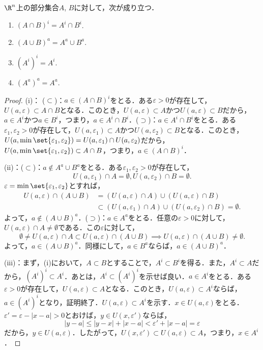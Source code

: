\documentclass[a4paper,10pt]{ltjsarticle}
\begin{document}
\begin{MyProposition}
  \(\R^n\)上の部分集合\(A\), \(B\)に対して，次が成り立つ．
  \begin{enumerate}
    \item \((A \cap B)^i = A^i \cap B^i\).
    \item \((A \cup B)^a = A^a \cup B^a\).
    \item \((A^i)^i = A^i\).
    \item \((A^a)^a = A^a\).
  \end{enumerate}
\end{MyProposition}
\begin{proof}
  (i)： (\(\subset\))：\(a \in (A \cap B)^i\)をとる．ある\(\varepsilon > 0\)が存在して，\(U(a, \varepsilon) \subset A \cap B\)となる．このとき，\(U(a, \varepsilon) \subset A\)かつ\(U(a, \varepsilon) \subset B\)だから，\(a \in A^i\)かつ\(a \in B^i\)，つまり，\(a \in A^i \cap B^i\)．(\(\supset\))：\(a \in A^i \cap B^i\)をとる．ある\(\varepsilon_1, \varepsilon_2 > 0\)が存在して，\(U(a, \varepsilon_1) \subset A\)かつ\(U(a, \varepsilon_2) \subset B\)となる．このとき，\(U(a, \min\set{\varepsilon_1, \varepsilon_2}) = U(a, \varepsilon_1) \cap U(a, \varepsilon_2)\)だから，\(U(a, \min\set{\varepsilon_1, \varepsilon_2}) \subset A\cap B\)，つまり，\(a \in (A\cap B)^i\)．

  (ii)：(\(\subset\))：\(a \notin A^a \cup B^a\)をとる．ある\(\varepsilon_1, \varepsilon_2 > 0\)が存在して，
  \[ U(a, \varepsilon_1) \cap A = \emptyset, U(a, \varepsilon_2) \cap B = \emptyset. \]
  \(\varepsilon = \min\set{\varepsilon_1, \varepsilon_2}\)とすれば，
  \begin{align*}
    U(a, \varepsilon) \cap (A \cup B) & = (U(a, \varepsilon) \cap A) \cup (U(a, \varepsilon) \cap B)                        \\
                                      & \subset (U(a, \varepsilon_1) \cap A) \cup (U(a, \varepsilon_2) \cap B) = \emptyset.
  \end{align*}
  よって，\(a\notin (A \cup B)^a\)．(\(\supset\))：\(a \in A^a\)をとる．任意の\(\varepsilon > 0\)に対して，
  \(U(a, \varepsilon) \cap A \ne \emptyset\)である．この\(\varepsilon\)に対して，
  \[ \emptyset \ne U(a, \varepsilon) \cap A \subset U(a, \varepsilon) \cap (A \cup B) \implies U(a, \varepsilon) \cap (A \cup B) \ne \emptyset. \]
  よって，\(a \in (A \cup B)^a\)．同様にして，\(a \in B^a\)ならば，\(a \in (A \cup B)^a\)．

  (iii)：まず，(i)において，\(A \subset B\)とすることで，\(A^i \subset B^i\)を得る．また，\(A^i \subset A\)だから，\((A^i)^i \subset A^i\)．あとは，\(A^i \subset (A^i)^i\)を示せば良い．\(a \in A^i\)をとる．ある\(\varepsilon > 0\)が存在して，\(U(a, \varepsilon) \subset A\)となる．このとき，\(U(a, \varepsilon) \subset A^i\)ならば，\(a \in (A^i)^i\)となり，証明終了．\(U(a, \varepsilon) \subset A^i\)を示す．\(x \in U(a, \varepsilon)\)をとる．\(\varepsilon' = \varepsilon - |x - a| > 0\)とおけば，\(y \in U(x, \varepsilon')\)ならば，
  \[ |y - a| \le |y - x| + |x - a| < \varepsilon' + |x - a| = \varepsilon \]
  だから，\(y \in U(a, \varepsilon)\)．したがって，\(U(x, \varepsilon') \subset U(a, \varepsilon) \subset A\)，つまり，\(x \in A^i\)．


\end{proof}
\end{document}
